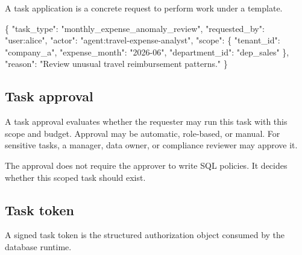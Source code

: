\documentclass[
]{article}
\newenvironment{Shaded}{}{}
\newcommand{\DataTypeTok}[1]{\textcolor[rgb]{0.56,0.13,0.00}{#1}}
\newcommand{\FunctionTok}[1]{\textcolor[rgb]{0.02,0.16,0.49}{#1}}
\newcommand{\StringTok}[1]{\textcolor[rgb]{0.25,0.44,0.63}{#1}}
\begin{document}
A task application is a concrete request to perform work under a
template.

\begin{Shaded}
\begin{Highlighting}[]
\FunctionTok{\{}
  \DataTypeTok{"task\_type"}\FunctionTok{:} \StringTok{"monthly\_expense\_anomaly\_review"}\FunctionTok{,}
  \DataTypeTok{"requested\_by"}\FunctionTok{:} \StringTok{"user:alice"}\FunctionTok{,}
  \DataTypeTok{"actor"}\FunctionTok{:} \StringTok{"agent:travel{-}expense{-}analyst"}\FunctionTok{,}
  \DataTypeTok{"scope"}\FunctionTok{:} \FunctionTok{\{}
    \DataTypeTok{"tenant\_id"}\FunctionTok{:} \StringTok{"company\_a"}\FunctionTok{,}
    \DataTypeTok{"expense\_month"}\FunctionTok{:} \StringTok{"2026{-}06"}\FunctionTok{,}
    \DataTypeTok{"department\_id"}\FunctionTok{:} \StringTok{"dep\_sales"}
  \FunctionTok{\},}
  \DataTypeTok{"reason"}\FunctionTok{:} \StringTok{"Review unusual travel reimbursement patterns."}
\FunctionTok{\}}
\end{Highlighting}
\end{Shaded}

\hypertarget{task-approval}{%
\subsection{Task approval}\label{task-approval}}

A task approval evaluates whether the requester may run this task with
this scope and budget. Approval may be automatic, role-based, or manual.
For sensitive tasks, a manager, data owner, or compliance reviewer may
approve it.

The approval does not require the approver to write SQL policies. It
decides whether this scoped task should exist.

\hypertarget{task-token}{%
\subsection{Task token}\label{task-token}}

A signed task token is the structured authorization object consumed by
the database runtime.
\end{document}

